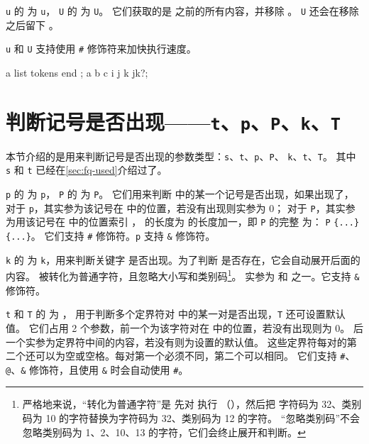 \documentclass[openany]{book}
\begin{document}
\texttt u 的  为 \verb|u|，
\texttt U 的  为 \verb|U|。
它们获取的是  之前的所有内容，并移除 。
\texttt U 还会在移除  之后留下 。

\texttt u 和 \texttt U 支持使用 \texttt\# 修饰符来加快执行速度。

\begin{examcode}{}
\DeclareEKeysCommand {} {\detokenize{[#1|#2]}}
\DeclareEKeysCommand {} {\detokenize{[#1|#2]}}
\ttfamily\obeylines
\faa a list tokens \relax end \relax{};
\fbb a b c i j k jk{?};
\end{examcode}

\section{判断记号是否出现——\texttt t、\texttt p、\texttt P、\texttt k、\texttt T}

本节介绍的是用来判断记号是否出现的参数类型：\texttt s、\texttt t、\texttt p、\texttt P、
\texttt k、\texttt t、\texttt T。
其中 \texttt s 和 \texttt t 已经在\cref{sec:fq-used}介绍过了。

\texttt p 的  为 \verb|p|，
\texttt P 的  为 \verb|P|。
它们用来判断  中的某一个记号是否出现，如果出现了，
对于 \texttt p，其实参为该记号在  中的位置，若没有出现则实参为 0；
对于 \texttt P，其实参为用该记号在  中的位置索引 ，
 的长度为  的长度加一，即 \texttt P 的完整 
 为：
\verb|P| \texttt{\{...\}
\{...\}}。
它们支持 \texttt\# 修饰符。\texttt p 支持 \texttt\& 修饰符。

\texttt k 的  为 \verb|k|，用来判断关键字 
是否出现。为了判断  是否存在，它会自动展开后面的内容。
 被转化为普通字符，且忽略大小写和类别码\footnote{严格地来说，“转化为普通字符”是
先对  执行 （），然后把
字符码为 32、类别码为 10 的字符替换为字符码为 32、类别码为 12 的字符。
“忽略类别码”不会忽略类别码为 1、2、10、13 的字符，它们会终止展开和判断。}。
实参为  和  之一。它支持 \texttt\& 修饰符。

\texttt t 和 \texttt T 的  为 ，
用于判断多个定界符对  中的某一对是否出现，\texttt T 还可设置默认值。
它们占用 2 个参数，前一个为该字符对在  中的位置，若没有出现则为 0。
后一个实参为定界符中间的内容，若没有则为设置的默认值。
这些定界符每对的第二个还可以为空或空格。每对第一个必须不同，第二个可以相同。
它们支持 \texttt\#、\texttt @、\texttt\& 修饰符，且使用 \texttt\& 时会自动使用 \texttt\#。
\end{document}
